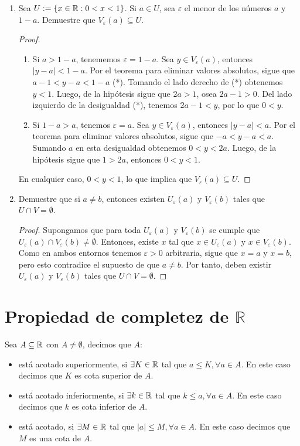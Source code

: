 \begin{enumerate}[label=\alph*)]
 \item Sea $U:=\{x\in \mathbb{R}: 0<x<1\}$. Si $a\in U$, sea $\varepsilon$ el menor de los números $a$ y $1-a$. Demuestre que $V_\varepsilon(a) \subseteq U$.
 \begin{proof} \leavevmode
  \begin{enumerate}[label=\roman*)]
   \item Si $a>1-a$, tenememos $\varepsilon=1-a$. Sea $y\in V_\varepsilon(a)$, entonces $|y-a|<1-a$. Por el teorema para eliminar valores absolutos, sigue que $a-1<y-a<1-a$ (*). Tomando el lado derecho de (*) obtenemos $y<1$. Luego, de la hipótesis sigue que $2a>1$, osea $2a-1>0$. Del lado izquierdo de la desigualdad (*), tenemos $2a-1<y$, por lo que $0<y$.
   \item Si $1-a>a$, tenemos $\varepsilon=a$. Sea $y\in V_\varepsilon(a)$, entonces $|y-a|<a$. Por el teorema para eliminar valores absolutos, sigue que $-a<y-a<a$. Sumando $a$ en esta desigualdad obtenemos $0<y<2a$. Luego, de la hipótesis sigue que $1>2a$, entonces $0<y<1$.\end{enumerate}
   En cualquier caso, $0<y<1$, lo que implica que $V_\varepsilon(a) \subseteq U$. 
 \end{proof}

 \item Demuestre que si $a\neq b$, entonces existen $U_\varepsilon(a)$ y $V_\varepsilon(b)$ tales que $U\cap V =\emptyset$.
 \begin{proof} 
  Supongamos que para toda $U_\varepsilon(a)$ y $V_\varepsilon(b)$ se cumple que $U_\varepsilon(a) \cap V_\varepsilon(b) \neq \emptyset$. Entonces, existe $x$ tal que $x\in U_\varepsilon(a)$ y $x\in V_\varepsilon(b)$. Como en ambos entornos tenemos $\varepsilon>0$ arbitraria, sigue que $x=a$ y $x=b$, pero esto contradice el supuesto de que $a\neq b$. Por tanto, deben existir $U_\varepsilon(a)$ y $V_\varepsilon(b)$ tales que $U\cap V =\emptyset$. 
 \end{proof}
\end{enumerate}

\section*{Propiedad de completez de \(\mathbb{R}\)}

 Sea $A\subseteq \mathbb{R}$ con $A\neq \emptyset$, decimos que $A$:
\begin{itemize}
 \item está acotado superiormente, si $\exists K\in \mathbb{R}$ tal que $a \leq K, \forall a\in A$. En este caso decimos que $K$ es cota superior de $A$.

 \item está acotado inferiormente, si $\exists k\in \mathbb{R}$ tal que $k \leq a, \forall a\in A$. En este caso decimos que $k$ es cota inferior de $A$.

 \item está acotado, si $\exists M\in \mathbb{R}$ tal que $|a|\leq M,\forall a \in A$. En este caso decimos que $M$ es una cota de $A$.
\end{itemize}

